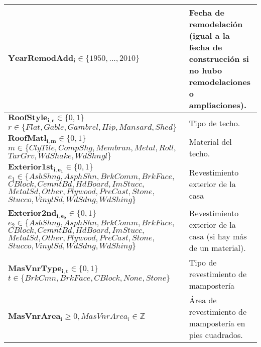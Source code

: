 \begin{longtable}{ | p{8cm} | p{5cm} | }
    \hline
    $\boldsymbol{YearRemodAdd_{i}} \in \{1950, ..., 2010\}$ & Fecha de remodelación (igual a la fecha de construcción si no hubo remodelaciones o ampliaciones).\\
    \hline
    $\boldsymbol{RoofStyle_{i,r}} \in \{0, 1\}$\newline 
    $r \in \{Flat, Gable, Gambrel, Hip, Mansard, Shed\}$ & Tipo de techo.\\
    \hline
    $\boldsymbol{RoofMatl_{i,m}} \in \{0, 1\}$\newline 
    $m \in \{ClyTile, CompShg, Membran, Metal, Roll,$ \newline \hspace{1cm}$TarGrv, WdShake, WdShngl\}$ & Material del techo.\\
    \hline
    $\boldsymbol{Exterior1st_{i,e_1}} \in \{0, 1\}$\newline 
    $e_{1} \in \{AsbShng, AsphShn, BrkComm, BrkFace,$\newline 
    \hspace{1cm} $CBlock, CemntBd, HdBoard, ImStucc,$\newline 
    \hspace{1cm} $MetalSd, Other, Plywood, PreCast, Stone,$\newline 
    \hspace{1cm}$Stucco, VinylSd, WdSdng, WdShing\}$ & Revestimiento exterior de la casa\\
    \hline
    $\boldsymbol{Exterior2nd_{i,e_2}} \in \{0, 1\}$\newline 
    $e_{2} \in \{AsbShng, AsphShn, BrkComm, BrkFace,$\newline 
    \hspace{1cm} $CBlock, CemntBd, HdBoard, ImStucc,$\newline 
    \hspace{1cm} $MetalSd, Other, Plywood, PreCast, Stone,$\newline 
    \hspace{1cm}$Stucco, VinylSd, WdSdng, WdShing\}$ & Revestimiento exterior de la casa (si hay más de un material).\\
    \hline
    $\boldsymbol{MasVnrType_{i,t}} \in \{0, 1\}$\newline 
    $t \in \{BrkCmn, BrkFace, CBlock, None, Stone\}$ & Tipo de revestimiento de mampostería\\
    \hline
    $\boldsymbol{MasVnrArea_{i}} \geq 0, MasVnrArea_{i} \in \mathbb{Z}$ & Área de revestimiento de mampostería en pies cuadrados.\\

\end{longtable}
